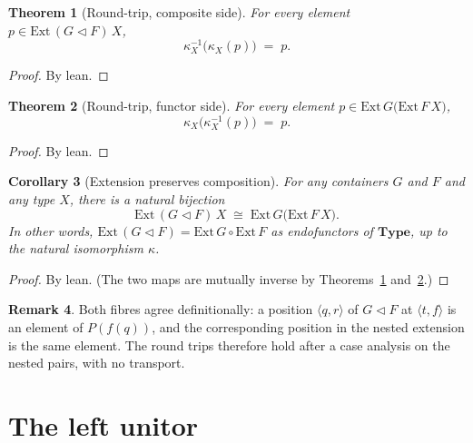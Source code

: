 \documentclass[11pt,a4paper]{article}
\theoremstyle{plain}
\newtheorem{theorem}{Theorem}[section]
\newtheorem{corollary}[theorem]{Corollary}
\theoremstyle{definition}
\newtheorem{remark}[theorem]{Remark}
\newcommand{\Ext}{\mathrm{Ext}}
\newcommand{\Type}{\mathbf{Type}}
\newcommand{\compop}{\mathbin{\triangleleft}}
\begin{document}
\begin{theorem}[Round-trip, composite side]\label{thm:comp-rt-1}
For every element $p\in\Ext\,(G\compop F)\,X$,
\begin{equation}
  \kappa_X^{-1}\bigl(\kappa_X(p)\bigr) \;=\; p.
\end{equation}
\end{theorem}

\begin{proof}
By lean.
\end{proof}

\begin{theorem}[Round-trip, functor side]\label{thm:comp-rt-2}
For every element $p\in\Ext\,G\bigl(\Ext\,F\,X\bigr)$,
\begin{equation}
  \kappa_X\bigl(\kappa_X^{-1}(p)\bigr) \;=\; p.
\end{equation}
\end{theorem}

\begin{proof}
By lean.
\end{proof}

\begin{corollary}[Extension preserves composition]\label{cor:ext-comp}
For any containers $G$ and $F$ and any type $X$, there is a natural bijection
\begin{equation}
  \Ext\,(G\compop F)\,X
  \;\cong\;
  \Ext\,G\bigl(\Ext\,F\,X\bigr).
\end{equation}
In other words, $\Ext\,(G\compop F)=\Ext\,G\circ\Ext\,F$ as endofunctors of
$\Type$, up to the natural isomorphism $\kappa$.
\end{corollary}

\begin{proof}
By lean. (The two maps are mutually inverse by Theorems~\ref{thm:comp-rt-1}
and~\ref{thm:comp-rt-2}.)
\end{proof}

\begin{remark}
Both fibres agree definitionally: a position
$\langle q,r\rangle$ of $G\compop F$ at $\langle t,f\rangle$ is an element of
$P(f(q))$, and the corresponding position in the nested extension is the same
element. The round trips therefore hold after a case analysis on the nested
pairs, with no transport.
\end{remark}

\section{The left unitor}
\end{document}

